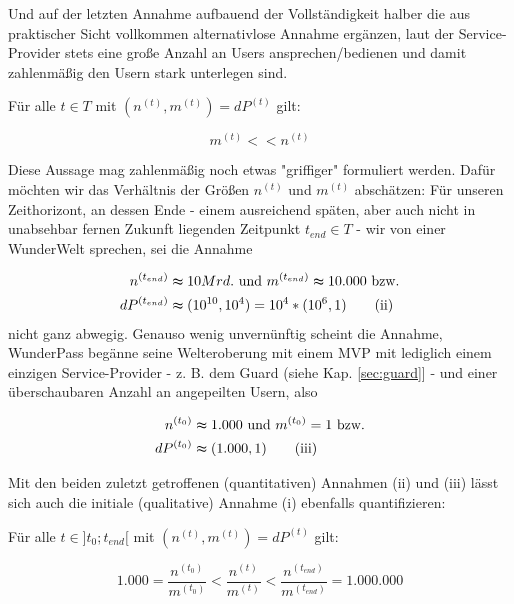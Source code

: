\vspace{0.3cm}

Und auf der letzten Annahme aufbauend der Vollständigkeit halber die aus praktischer Sicht vollkommen alternativlose Annahme ergänzen, laut der Service-Provider stets eine große Anzahl an Users ansprechen/bedienen und damit zahlenmäßig den Usern stark unterlegen sind.

\vspace{0.3cm}


\begin{Assumption}\label{assumptionRatio}
Für alle $t \in T$ mit $\left(n^{(t)}, m^{(t)}\right) = dP^{(t)}$ gilt:

\begin{equation*}
m^{(t)} << n^{(t)} \tag{i}
\end{equation*}

\vspace{0.3cm}

Diese Aussage mag zahlenmäßig noch etwas "griffiger" formuliert werden. Dafür möchten wir das Verhältnis der Größen $n^{(t)}$ und $m^{(t)}$ abschätzen: Für unseren Zeithorizont, an dessen Ende - einem ausreichend späten, aber auch nicht in unabsehbar fernen Zukunft liegenden Zeitpunkt $t_{end} \in T$ - wir von einer WunderWelt sprechen, sei die Annahme

\begin{align*}
n^{(t_{end})} &\thickapprox 10 Mrd. \textrm{ und } m^{(t_{end})} \thickapprox 10.000 \textrm{ bzw.} \\
dP^{(t_{end})} &\thickapprox (10^{10}, 10^{4}) = 10^{4} * (10^{6}, 1) \tag{ii}
\end{align*}
nicht ganz abwegig. Genauso wenig unvernünftig scheint die Annahme, WunderPass begänne seine Welteroberung mit einem MVP mit lediglich einem einzigen Service-Provider - z. B. dem Guard (siehe Kap. \ref{sec:guard}] - und einer überschaubaren Anzahl an angepeilten Usern, also

\begin{align*}
n^{(t_0)} &\thickapprox 1.000 \textrm{ und } m^{(t_0)} = 1 \textrm{ bzw.} \\
dP^{(t_0)} &\thickapprox (1.000, 1) \tag{iii}
\end{align*}

\vspace{0.3cm}

Mit den beiden zuletzt getroffenen (quantitativen) Annahmen (ii) und (iii) lässt sich auch die initiale (qualitative) Annahme (i) ebenfalls quantifizieren:

\vspace{0.3cm}

Für alle $t \in ]t_0; t_{end}[$ mit $\left(n^{(t)}, m^{(t)}\right) = dP^{(t)}$ gilt:

\begin{equation*}
1.000 = \frac{n^{(t_0)}}{m^{(t_0)}} < \frac{n^{(t)}}{m^{(t)}} < \frac{n^{(t_{end})}}{m^{(t_{end})}} = 1.000.000 \tag{iv}
\end{equation*}

\end{Assumption}

